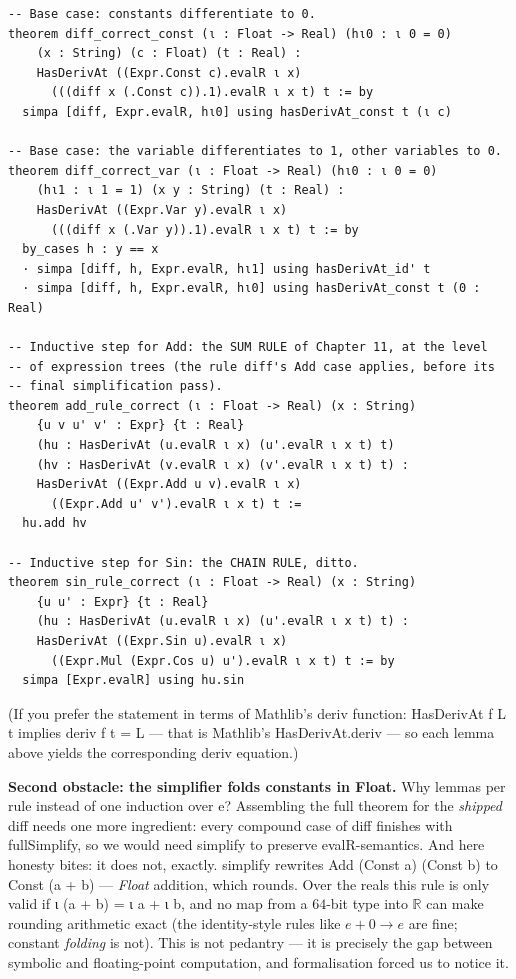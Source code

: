 \documentclass[12pt, openany]{book}
\theoremstyle{plain}
\theoremstyle{definition}
\theoremstyle{remark}
\newcommand{\R}{\mathbb{R}}
\newcommand{\li}[1]{{\ttfamily\small\color{tealaccent}#1}}
\begin{document}
\begin{leanbox}
\begin{lstlisting}
-- Base case: constants differentiate to 0.
theorem diff_correct_const (ι : Float -> Real) (hι0 : ι 0 = 0)
    (x : String) (c : Float) (t : Real) :
    HasDerivAt ((Expr.Const c).evalR ι x)
      (((diff x (.Const c)).1).evalR ι x t) t := by
  simpa [diff, Expr.evalR, hι0] using hasDerivAt_const t (ι c)

-- Base case: the variable differentiates to 1, other variables to 0.
theorem diff_correct_var (ι : Float -> Real) (hι0 : ι 0 = 0)
    (hι1 : ι 1 = 1) (x y : String) (t : Real) :
    HasDerivAt ((Expr.Var y).evalR ι x)
      (((diff x (.Var y)).1).evalR ι x t) t := by
  by_cases h : y == x
  · simpa [diff, h, Expr.evalR, hι1] using hasDerivAt_id' t
  · simpa [diff, h, Expr.evalR, hι0] using hasDerivAt_const t (0 : Real)

-- Inductive step for Add: the SUM RULE of Chapter 11, at the level
-- of expression trees (the rule diff's Add case applies, before its
-- final simplification pass).
theorem add_rule_correct (ι : Float -> Real) (x : String)
    {u v u' v' : Expr} {t : Real}
    (hu : HasDerivAt (u.evalR ι x) (u'.evalR ι x t) t)
    (hv : HasDerivAt (v.evalR ι x) (v'.evalR ι x t) t) :
    HasDerivAt ((Expr.Add u v).evalR ι x)
      ((Expr.Add u' v').evalR ι x t) t :=
  hu.add hv

-- Inductive step for Sin: the CHAIN RULE, ditto.
theorem sin_rule_correct (ι : Float -> Real) (x : String)
    {u u' : Expr} {t : Real}
    (hu : HasDerivAt (u.evalR ι x) (u'.evalR ι x t) t) :
    HasDerivAt ((Expr.Sin u).evalR ι x)
      ((Expr.Mul (Expr.Cos u) u').evalR ι x t) t := by
  simpa [Expr.evalR] using hu.sin
\end{lstlisting}
\end{leanbox}
\color{black}

(If you prefer the statement in terms of Mathlib's \li{deriv} function:
\li{HasDerivAt f L t} implies \li{deriv f t = L} --- that is Mathlib's
\li{HasDerivAt.deriv} --- so each lemma above yields the corresponding
\li{deriv} equation.)

\textbf{Second obstacle: the simplifier folds constants in \li{Float}.}
Why lemmas per rule instead of one induction over \li{e}?  Assembling the full
theorem for the \emph{shipped} \li{diff} needs one more ingredient: every
compound case of \li{diff} finishes with \li{fullSimplify}, so we would need
\li{simplify} to preserve \li{evalR}-semantics.  And here honesty bites:
it does not, exactly.  \li{simplify} rewrites \li{Add (Const a) (Const b)}
to \li{Const (a + b)} --- \emph{Float} addition, which rounds.  Over the reals
this rule is only valid if \li{ι (a + b) = ι a + ι b}, and no map from a
$64$-bit type into $\R$ can make rounding arithmetic exact (the identity-style
rules like $e + 0 \to e$ are fine; constant \emph{folding} is not).  This is
not pedantry --- it is precisely the gap between symbolic and floating-point
computation, and formalisation forced us to notice it.
\end{document}
